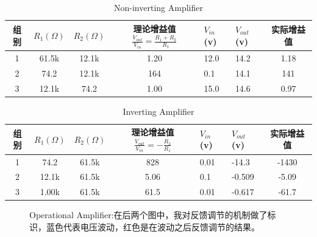\documentclass[UTF8]{ctexart}
\begin{document}
\begin{table}
    \centering
    \begin{tabular}{|c|c|c|c|l|l|c|} \hline 
         组别&  $R_1(\Omega)$&  $R_2(\Omega)$&  理论增益值$\frac{V_{out}}{V_{in}}=\frac{R_1+R_2}{R_1}$&   $V_{in}$(v)&$V_{out}$(v)&实际增益值\\ \hline 
         1&  61.5k&  12.1k&  1.20&   12.0&14.2&1.18\\ \hline 
         2&  74.2&  12.1k&  164&   0.1&14.1&141\\ \hline 
         3&  12.1k&  74.2&  1.00&   15.0&14.6&0.97\\ \hline
    \end{tabular}
    \caption{Non-inverting Amplifier}
    \label{Non-inverting Amplifier}
\end{table}
\begin{table}
    \centering
    \begin{tabular}{|c|c|c|c|l|l|c|} \hline 
         组别&  $R_1(\Omega)$&  $R_2(\Omega)$&  理论增益值$\frac{V_{out}}{V_{in}}=-\frac{R_2}{R_1}$&   $V_{in}$(v)&$V_{out}$(v)&实际增益值\\ \hline 
         1&  74.2&  61.5k&  828&   0.01&-14.3&-1430\\ \hline 
         2&  12.1k&  61.5k&  5.06&   0.1&-0.509&-5.09\\ \hline 
         3&  1.00k&  61.5k&  61.5&   0.01&-0.617&-61.7\\ \hline
    \end{tabular}
    \caption{Inverting Amplifier}
    \label{inverting Amplifier}
\end{table}

\begin{figure}
\centering  %
\caption{Operational Amplifier:在后两个图中，我对反馈调节的机制做了标识，蓝色代表电压波动，红色是在波动之后反馈调节的结果。}
\end{figure}
\end{document}
